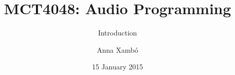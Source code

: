 \documentclass[screen, aspectratio=43]{beamer}
\title[AP-intro]{MCT4048: Audio Programming}
\subtitle{Introduction}
\author[A. Xamb{\'o}]{Anna Xamb{\'o}}
\institute[NTNU]{Department of Music, NTNU}
\date{15 January 2015}
\begin{document}
\begin{frame}
  \titlepage
\end{frame}


%
\end{document}
